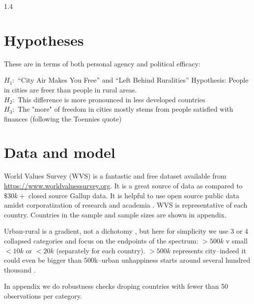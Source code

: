 \documentclass[10pt, letterpaper]{article}
\begin{document}
\begin{spacing}{1.4}
\section{Hypotheses}

These are in terms of both personal agency and political efficacy:

$H_1:$ ``City Air Makes You Free'' and ``Left Behind Ruralities'' Hypothesis: 
People in cities are freer than people in rural areas.\\

$H_2:$ This difference is more pronounced in less developed countries\\

$H_3:$ The "more" of freedom in cities mostly stems from people satisfied with
finances (following the Toennies quote)\\



\section{Data and model}

 World Values Survey (WVS) is a fantastic and free dataset available from 
 \url{https://www.worldvaluessurvey.org}. It is a great source of data as
 compared to $\$30k+$ closed source Gallup data. It is helpful to use open
 source public data amidst corporatization of research and academia
 \citep{mills2012corporatization,cox2013corporatization,millsNYT12fa,CatropaNYT20feb8,schmidlinNYT15oct10}. 
WVS is representative of each country. Countries in the sample and sample sizes are shown in appendix.



Urban-rural is a gradient, not a dichotomy \citep{aok-ls_fisher16}, but here for
simplicity we use 3 or 4 collapsed categories and focus on the endpoints of the spectrum: $>500k$ v small $<10k$ or $<20k$ (separately for each
country). $>500k$ represents city--indeed it could even be bigger than 500k--urban
unhappiness starts around several hundred thousand \citep{aok-ls_fisher16}.

In appendix we do robustness checks droping countries with fewer than 50
observations per category.



\end{spacing}
\end{document}

